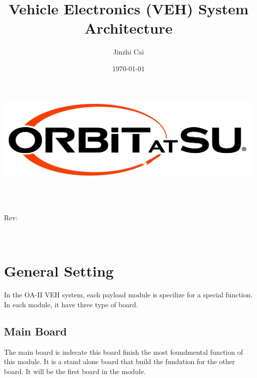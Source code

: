 \documentclass[12pt,article]{memoir}
\title{Vehicle Electronics (VEH) System Architecture}
\author{Jinzhi Cai}
\date{\today}
\makeatletter
\newcommand\@itemcode{}
\newcommand\@revnumber{}
\makeatother
\begin{document}

\makeatletter
	\includegraphics[width=\textwidth]{../logo.jpg}\\[4ex]
	\begin{center}
	{\fontsize{50}{60}\selectfont \bfseries  \@title }\\[2ex] 
	{\LARGE  \@itemcode}\\
	\end{center}
	\begin{flushright}
	\vspace*{\fill}
	{\LARGE Rev: \@revnumber}\\[2ex]
	{\large \@author}\\[2ex]
	{\large \@date}\\[20ex]
	\end{flushright}
\makeatother
\thispagestyle{empty}
\newpage

\tableofcontents*
\thispagestyle{fancy}
\newpage

\chapter{General Setting}
In the OA-II VEH system, each payload module is specilize for a special function. In each module, it have three type of board.  
\section{Main Board}%
The main board is indecate this board finish the most foundmental function of this module. It is a stand alone board that build the fundation for the other board. It will be the first board in the module. 
\end{document}
